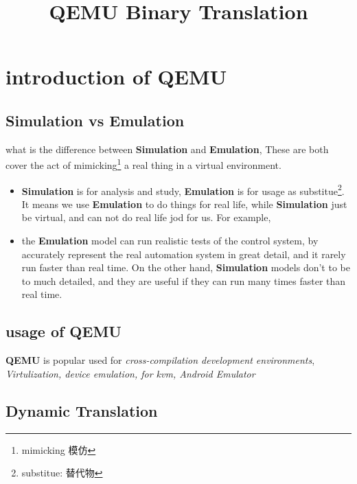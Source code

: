 \documentclass[12pt]{article}
\title{QEMU \- Binary Translation}
\begin{document}
\maketitle

\section{introduction of QEMU}

\subsection{Simulation vs Emulation}
what is the difference between \textbf{Simulation}  and \textbf{Emulation}, These are both cover the act of mimicking\footnote{mimicking 模仿} a real thing in a virtual environment.
\begin{itemize}
    \item \textbf{Simulation} is for analysis and study, \textbf{Emulation} is for usage as substitue\footnote{substitue: 替代物}. It means we use \textbf{Emulation} to do things for real life, while \textbf{Simulation} just be virtual, and can not do real life jod for us. For example, 
    \item the \textbf{Emulation} model can run realistic tests of the control system, by accurately represent the real automation system in great detail, and it rarely run faster than real time. On the other hand, \textbf{Simulation} models don't to be to much detailed, and they are useful if they can run many times faster than real time.
\end{itemize}

\subsection{usage of QEMU}
\textbf{QEMU} is popular used for \textit{cross-compilation development environments}, \textit{Virtulization, device emulation, for kvm, Android Emulator} 

\subsection{Dynamic Translation}
\end{document}

